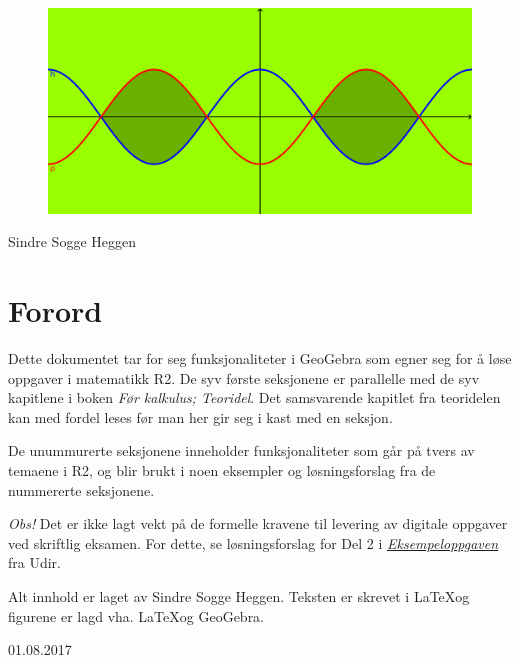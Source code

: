


	\pagecolor{cyan!40}
	\begin{titlepage}
		\begin{center}
			\vspace*{2.8cm}
			
			{}
			\vspace{6cm} 
			\begin{figure}[H]
				\centering
				\includegraphics[scale=1]{front}
			\end{figure}           
			\vspace{5 cm}
			\raggedleft Sindre Sogge Heggen   \end{center}
	\end{titlepage}
	\pagecolor{white}
	\newpage\thispagestyle{empty} 
\section*{Forord}
Dette dokumentet tar for seg funksjonaliteter i GeoGebra som egner seg for å løse oppgaver i matematikk R2. De syv første seksjonene er parallelle med de syv kapitlene i boken \textit{Før kalkulus; Teoridel}. Det samsvarende kapitlet fra teoridelen kan med fordel leses før man her gir seg i kast med en seksjon.\vsk

De unummurerte seksjonene inneholder funksjonaliteter som går på tvers av temaene i R2, og blir brukt i noen eksempler og løsningsforslag fra de nummererte seksjonene.\vsk

\textsl{Obs!} Det er ikke lagt vekt på de formelle kravene til levering av digitale oppgaver ved skriftlig eksamen. For dette, se løsningsforslag for Del 2 i \href{http://forkalkulus.netlify.com/eks/R2_V15_e.pdf}{\textsl{\color{blue} Eksempeloppgaven}} fra Udir.
	\vfill       \begin{center}
		Alt innhold er laget av Sindre Sogge Heggen. Teksten er skrevet i \LaTeX\;og figurene er lagd vha. \LaTeX og GeoGebra.\vsk
		
		
		01.08.2017
	\end{center}
	


